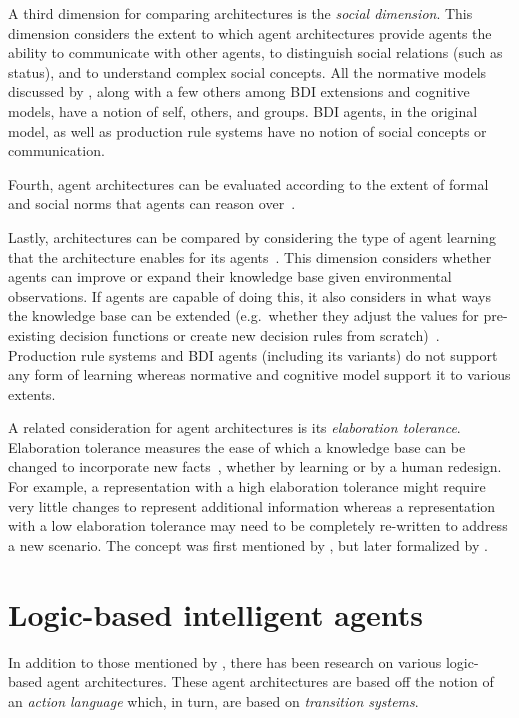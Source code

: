 A third dimension for comparing architectures is the \textit{social dimension}.
This dimension considers the extent to which agent architectures provide agents the ability to communicate with other agents, to distinguish social relations (such as status), and to understand complex social concepts.
All the normative models discussed by \citet{balke_how_2014}, along with a few others among BDI extensions and cognitive models, have a notion of self, others, and groups.
BDI agents, in the original model, as well as production rule systems have no notion of social concepts or communication.

Fourth, agent architectures can be evaluated according to the extent of formal and social norms that agents can reason over~\citep{balke_how_2014}.

Lastly, architectures can be compared by considering the type of agent learning that the architecture enables for its agents~\citep{balke_how_2014}.
This dimension considers whether agents can improve or expand their knowledge base given environmental observations.
If agents are capable of doing this, it also considers in what ways the knowledge base can be extended (e.g.~whether they adjust the values for pre-existing decision functions or create new decision rules from scratch)~\citep{balke_how_2014}.
Production rule systems and BDI agents (including its variants) do not support any form of learning whereas normative and cognitive model support it to various extents.

A related consideration for agent architectures is its \textit{elaboration tolerance}.
Elaboration tolerance measures the ease of which a knowledge base can be changed to incorporate new facts~\citep{parmar_formalizing_2003}, whether by learning or by a human redesign.
For example, a representation with a high elaboration tolerance might require very little changes to represent additional information whereas a representation with a low elaboration tolerance may need to be completely re-written to address a new scenario.
The concept was first mentioned by \citet{mccarthy_mathematical_1988}, but later formalized by \citet{parmar_formalizing_2003}.

\section{Logic-based intelligent agents}
\label{sec:logic_based_agents}

In addition to those mentioned by \citet{balke_how_2014}, there has been research on various logic-based agent architectures.
These agent architectures are based off the notion of an \textit{action language} which, in turn, are based on \textit{transition systems}.

